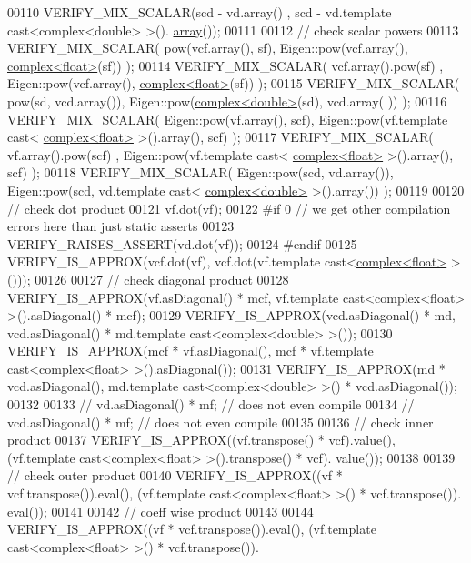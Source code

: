 \begin{DoxyCode}
00110   VERIFY\_MIX\_SCALAR(scd - vd.array() , scd - vd.template cast<complex<double> >().
      \hyperlink{class_eigen_1_1array}{array}());
00111 
00112   \textcolor{comment}{// check scalar powers}
00113   VERIFY\_MIX\_SCALAR( pow(vcf.array(), sf),        Eigen::pow(vcf.array(), 
      \hyperlink{structcomplex}{complex<float>}(sf)) );
00114   VERIFY\_MIX\_SCALAR( vcf.array().pow(sf) ,        Eigen::pow(vcf.array(), 
      \hyperlink{structcomplex}{complex<float>}(sf)) );
00115   VERIFY\_MIX\_SCALAR( pow(sd, vcd.array()),        Eigen::pow(\hyperlink{structcomplex}{complex<double>}(sd), vcd.array(
      )) );
00116   VERIFY\_MIX\_SCALAR( Eigen::pow(vf.array(), scf), Eigen::pow(vf.template cast<
      \hyperlink{structcomplex}{complex<float>} >().array(), scf) );
00117   VERIFY\_MIX\_SCALAR( vf.array().pow(scf) ,        Eigen::pow(vf.template cast<
      \hyperlink{structcomplex}{complex<float>} >().array(), scf) );
00118   VERIFY\_MIX\_SCALAR( Eigen::pow(scd, vd.array()), Eigen::pow(scd, vd.template cast<
      \hyperlink{structcomplex}{complex<double>} >().array()) );
00119 
00120   \textcolor{comment}{// check dot product}
00121   vf.dot(vf);
00122 \textcolor{preprocessor}{#if 0 // we get other compilation errors here than just static asserts}
00123   VERIFY\_RAISES\_ASSERT(vd.dot(vf));
00124 \textcolor{preprocessor}{#endif}
00125   VERIFY\_IS\_APPROX(vcf.dot(vf), vcf.dot(vf.template cast<\hyperlink{structcomplex}{complex<float>} >()));
00126 
00127   \textcolor{comment}{// check diagonal product}
00128   VERIFY\_IS\_APPROX(vf.asDiagonal() * mcf, vf.template cast<complex<float> >().asDiagonal() * mcf);
00129   VERIFY\_IS\_APPROX(vcd.asDiagonal() * md, vcd.asDiagonal() * md.template cast<complex<double> >());
00130   VERIFY\_IS\_APPROX(mcf * vf.asDiagonal(), mcf * vf.template cast<complex<float> >().asDiagonal());
00131   VERIFY\_IS\_APPROX(md * vcd.asDiagonal(), md.template cast<complex<double> >() * vcd.asDiagonal());
00132 
00133 \textcolor{comment}{//   vd.asDiagonal() * mf;    // does not even compile}
00134 \textcolor{comment}{//   vcd.asDiagonal() * mf;   // does not even compile}
00135 
00136   \textcolor{comment}{// check inner product}
00137   VERIFY\_IS\_APPROX((vf.transpose() * vcf).value(), (vf.template cast<complex<float> >().transpose() * vcf).
      value());
00138 
00139   \textcolor{comment}{// check outer product}
00140   VERIFY\_IS\_APPROX((vf * vcf.transpose()).eval(), (vf.template cast<complex<float> >() * vcf.transpose()).
      eval());
00141 
00142   \textcolor{comment}{// coeff wise product}
00143 
00144   VERIFY\_IS\_APPROX((vf * vcf.transpose()).eval(), (vf.template cast<complex<float> >() * vcf.transpose()).

\end{DoxyCode}
